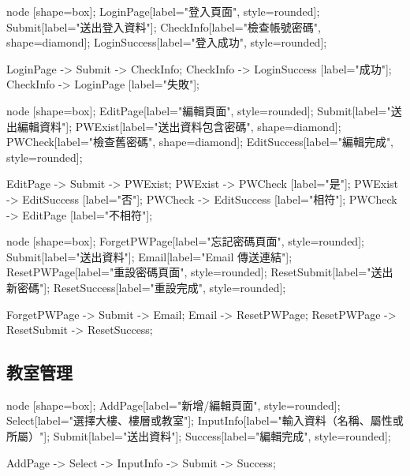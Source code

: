 \documentclass{article}
\begin{document}
\begin{center}

	 {
		node [shape=box];
		LoginPage[label="登入頁面", style=rounded];
		Submit[label="送出登入資料"];
		CheckInfo[label="檢查帳號密碼", shape=diamond];
		LoginSuccess[label="登入成功", style=rounded];

		LoginPage -> Submit -> CheckInfo;
		CheckInfo -> LoginSuccess [label="成功"];
		CheckInfo -> LoginPage [label="失敗"];
	}
\end{center}

\pagebreak

\begin{center}

	 {
		node [shape=box];
		EditPage[label="編輯頁面", style=rounded];
		Submit[label="送出編輯資料"];
		PWExist[label="送出資料包含密碼", shape=diamond];
		PWCheck[label="檢查舊密碼", shape=diamond];
		EditSuccess[label="編輯完成", style=rounded];

		EditPage -> Submit -> PWExist;
		PWExist -> PWCheck [label="是"];
		PWExist -> EditSuccess [label="否"];
		PWCheck -> EditSuccess [label="相符"];
		PWCheck -> EditPage [label="不相符"];
	}
\end{center}

\begin{center}

	 {
		node [shape=box];
		ForgetPWPage[label="忘記密碼頁面", style=rounded];
		Submit[label="送出資料"];
		Email[label="Email 傳送連結"];
		ResetPWPage[label="重設密碼頁面", style=rounded];
		ResetSubmit[label="送出新密碼"];
		ResetSuccess[label="重設完成", style=rounded];

		ForgetPWPage -> Submit -> Email;
		Email -> ResetPWPage;
		ResetPWPage -> ResetSubmit -> ResetSuccess;
	}

\end{center}

\pagebreak

\subsection{教室管理}

\begin{center}

	 {
		node [shape=box];
		AddPage[label="新增/編輯頁面", style=rounded];
		Select[label="選擇大樓、樓層或教室"];
		InputInfo[label="輸入資料（名稱、屬性或所屬）"];
		Submit[label="送出資料"];
		Success[label="編輯完成", style=rounded];

		AddPage -> Select -> InputInfo -> Submit -> Success;
	}
\end{center}
\end{document}
